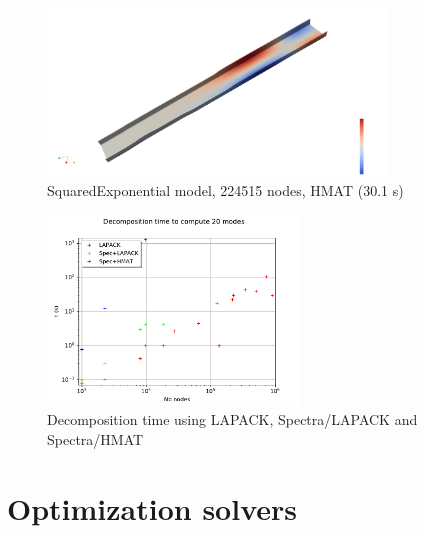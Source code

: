 \documentclass{beamer}
\begin{document}
\begin{frame}
\begin{figure}
\begin{center}
\includegraphics[width=0.8\textwidth]{figures/kl_large_hmat.png}
\end{center}
\caption{SquaredExponential model, 224515 nodes, HMAT (30.1 s)}
\end{figure}

\begin{figure}
\begin{center}
\includegraphics[width=0.6\textwidth]{figures/Decomposition.pdf}
\end{center}
\caption{Decomposition time using LAPACK, Spectra/LAPACK and Spectra/HMAT}
\end{figure}

\end{frame}


\section{Optimization solvers}

\end{document}
